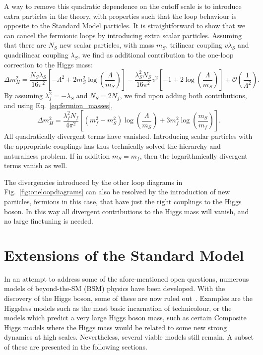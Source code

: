A way to remove this quadratic dependence on the cutoff scale is to introduce extra particles in
the theory, with properties such that the loop behaviour is opposite to the Standard Model
particles. It is straightforward to show that we can cancel the fermionic loops by introducing
extra scalar particles. 
Assuming that there are $N_S$ new scalar particles, with mass $m_S$, trilinear coupling $v\lambda_S$
and quadrilinear coupling $\lambda_S$, we find as additional contribution to the
one-loop correction to the Higgs mass:
\begin{equation}
  \Delta m_H^2 =  \frac{N_S\lambda_S}{16\pi^2} \left[ - \Lambda^2 + 2 m_S^2 \log
\left(\frac{\Lambda}{m_S}\right)\right] - \frac{\lambda_S^2 N_S}{16 \pi^2} v^2 \left[ -1 + 2
\log\left(\frac{\Lambda}{m_S}\right) \right] + \mathcal{O}\left(\frac{1}{\Lambda^2}\right) .
\end{equation}
By assuming $\lambda_f^2 = - \lambda_S$ and $N_S = 2 N_f$, we find upon adding both
contributions, and using Eq.~\ref{eq:fermion_masses},
\begin{equation}
  \Delta m_H^2 = \frac{\lambda_f^2 N_f}{4\pi^2} \left[ \left(m_f^2-m_S^2\right)
\log\left(\frac{\Lambda}{m_S}\right) + 3 m_f^2 \log\left(\frac{m_S}{m_f}\right) \right] .
\end{equation}
All quadratically divergent terms have vanished. Introducing scalar particles with the
appropriate couplings has thus technically solved the hierarchy and naturalness problem. 
If in addition $m_S = m_f$, then the logarithmically divergent terms vanish as well. 

The divergencies introduced by the other loop diagrams in Fig.~\ref{fig:oneloopdiagrams} can also be
resolved by the introduction of new particles, fermions in this case, that have just the right
couplings to the Higgs boson. In this way all divergent contributions to the Higgs mass will
vanish, and no large finetuning is needed. 


\section{Extensions of the Standard Model \label{sec:extensions_standard_model}}


In an attempt to address some of the afore-mentioned open questions, numerous models of
beyond-the-SM (BSM) physics have been developed. With the discovery of the Higgs boson, some of
these are now ruled out~\cite{Cheng:2007bu}. Examples are the Higgsless models such as the most
basic incarnation of technicolour, or the models which predict a very large Higgs boson mass, such
as certain Composite Higgs models where the Higgs mass would be related to some new strong dynamics
at high scales. 
Nevertheless, several viable models still remain. A subset of these are presented in the following
sections.

